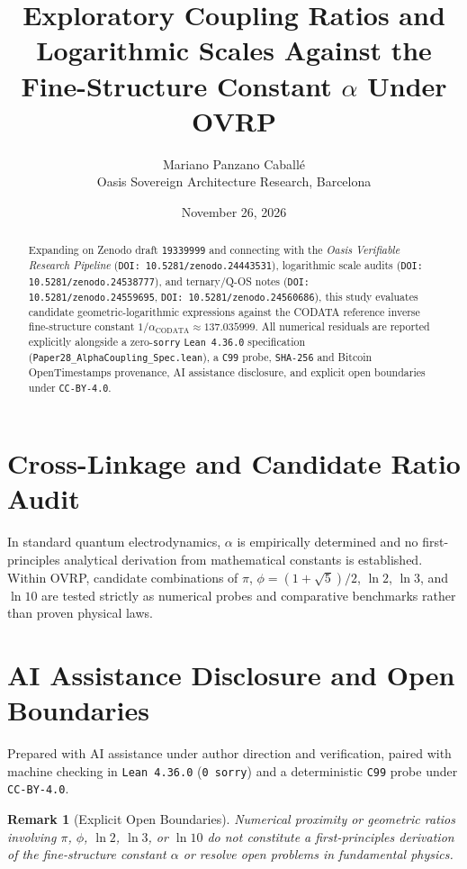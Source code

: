 \documentclass[11pt,a4paper]{article}
\title{Exploratory Coupling Ratios and Logarithmic Scales Against the Fine-Structure Constant $\alpha$ Under OVRP}
\author{Mariano Panzano Caball\'e \\ \small Oasis Sovereign Architecture Research, Barcelona}
\date{November 26, 2026}
\newtheorem{remark}{Remark}
\begin{document}
\maketitle

\begin{abstract}
Expanding on Zenodo draft \texttt{19339999} and connecting with the \emph{Oasis Verifiable Research Pipeline} (\texttt{DOI: 10.5281/zenodo.24443531}), logarithmic scale audits (\texttt{DOI: 10.5281/zenodo.24538777}), and ternary/Q-OS notes (\texttt{DOI: 10.5281/zenodo.24559695}, \texttt{DOI: 10.5281/zenodo.24560686}), this study evaluates candidate geometric-logarithmic expressions against the CODATA reference inverse fine-structure constant $1/\alpha_{\mathrm{CODATA}} \approx 137.035999$. All numerical residuals are reported explicitly alongside a zero-\texttt{sorry} \texttt{Lean~4.36.0} specification (\texttt{Paper28\_AlphaCoupling\_Spec.lean}), a \texttt{C99} probe, \texttt{SHA-256} and Bitcoin OpenTimestamps provenance, AI assistance disclosure, and explicit open boundaries under \texttt{CC-BY-4.0}.
\end{abstract}

\section{Cross-Linkage and Candidate Ratio Audit}
In standard quantum electrodynamics, $\alpha$ is empirically determined and no first-principles analytical derivation from mathematical constants is established. Within OVRP, candidate combinations of $\pi$, $\phi = (1+\sqrt{5})/2$, $\ln 2$, $\ln 3$, and $\ln 10$ are tested strictly as numerical probes and comparative benchmarks rather than proven physical laws.

\section*{AI Assistance Disclosure and Open Boundaries}
Prepared with AI assistance under author direction and verification, paired with machine checking in \texttt{Lean~4.36.0} (\texttt{0~sorry}) and a deterministic \texttt{C99} probe under \texttt{CC-BY-4.0}.

\begin{remark}[Explicit Open Boundaries]
Numerical proximity or geometric ratios involving $\pi$, $\phi$, $\ln 2$, $\ln 3$, or $\ln 10$ do not constitute a first-principles derivation of the fine-structure constant $\alpha$ or resolve open problems in fundamental physics.
\end{remark}
\end{document}
